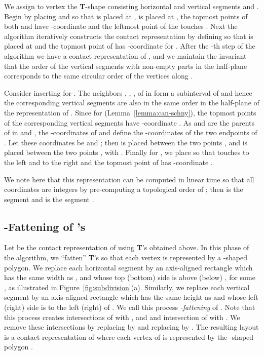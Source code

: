\documentclass[11pt]{article}
\begin{document}
We assign to vertex  the \textbf{T}-shape 
consisting horizontal and vertical segments  and .
Begin by placing  and  so that  is placed at ,  is placed at , the
 topmost points of both  and  have -coordinate  and the leftmost point of the  touches .
 Next the algorithm iteratively constructs the contact representation
 by defining  so that  is placed at  and the topmost point of  has
 -coordinate  for .  After the -th step of
 the algorithm we have a contact representation of , and we
 maintain the invariant that the order of the
 vertical segments with non-empty parts in the half-plane  corresponds to the same circular order of the
 vertices along .

Consider inserting  for . The neighbors , , , 
 of  in  form a subinterval of  and hence the corresponding vertical segments are
 also in the same order in the half-plane  of the representation of . Since  for  (Lemma~\ref{lemma:can-schny}),
the topmost points of the
 corresponding vertical segments have -coordinate . As  and   are the parents of  in
  and , the
 -coordinates of  and  define the -coordinates
 of the two endpoints of . Let
these coordinates be
  and ; then  is placed between the two points ,  and  is placed between
 the two points ,  with . Finally for , we place  so
 that  touches  to the left and  to the right and the topmost point of  has -coordinate .


We note here that this representation can be computed in linear time so that all coordinates are integers by pre-computing a topological order
 of ; then   is the
segment  and  is the
segment .


\subsection{-Fattening of 's}

Let  be the contact representation of  using \textbf{T}'s obtained above. In this
 phase of the algorithm, we ``fatten'' \textbf{T}'s
 so that each vertex is represented by a -shaped polygon. We
 replace each horizontal segment  by an axis-aligned rectangle
  which has the same width as , and whose top
 (bottom) side is  above (below) , for some ,
 as illustrated in Figure~\ref{fig:subdivision}(a).
 Similarly, we replace each vertical segment  by an
 axis-aligned rectangle  which has the same height as  and whose left (right) side is  to the left (right) of .
 We call this process \textit{-fattening} of . Note that
 this process creates intersections of  with ,
  and  and intersection of  with . We remove these intersections
 by replacing  by  and replacing  by . The
 resulting layout is a contact representation  of  where each vertex  of  is
 represented by the -shaped polygon .
\end{document}
